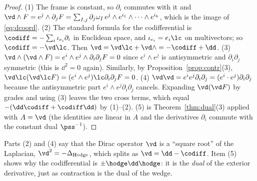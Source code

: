 \begin{proof}
(1) The frame is constant, so $\partial_i$ commutes with it and
$\vd\wedge F=e^j\wedge\partial_jF=\sum_{I,j}\partial_j\omega_I\,e^j\wedge e^{i_1}\wedge\cdots\wedge e^{i_k}$, which is the image of \eqref{eq:dcoord}.
(2) The standard formula for the codifferential is $\codiff=-\sum_i\iota_{e_i}\partial_{i}$ in Euclidean space, and $\iota_{e_i}=e_i\lc$ on multivectors; so $\codiff=-\vd\lc$. Then $\vd=\vd\lc+\vd\wedge=-\codiff+\dd$.
(3) $\vd\wedge(\vd\wedge F)=e^i\wedge e^j\wedge\partial_i\partial_jF=0$ since $e^i\wedge e^j$ is antisymmetric and $\partial_i\partial_j$ symmetric (this is $\dd^2=0$ again). Similarly, by Proposition~\ref{prop:contr}(3), $\vd\lc(\vd\lc F)=(e^i\wedge e^j)\lc\partial_i\partial_jF=0$.
(4) $\vd\vd=e^ie^j\partial_i\partial_j=(e^i\cdot e^j)\partial_i\partial_j$ because the antisymmetric part $e^i\wedge e^j\partial_i\partial_j$ cancels. Expanding $\vd(\vd F)$ by grades and using (3) leaves the two cross terms, which equal $-(\dd\codiff+\codiff\dd)$ by (1)--(2).
(5) is Theorem~\ref{thm:dual}(3) applied with $A=\vd$ (the identities are linear in $A$ and the derivatives $\partial_i$ commute with the constant dual $\pss^{-1}$).
\end{proof}

\begin{remark}
Parts (2) and (4) say that the Dirac operator $\vd$ is a ``square root'' of the Laplacian, $\vd^2=-\Delta_{\mathrm{Hodge}}$, which splits as $\vd=\dd-\codiff$. Item (5) shows why the codifferential is $\pm\hodge\dd\hodge$: it is the \emph{dual} of the exterior derivative, just as contraction is the dual of the wedge.
\end{remark}
